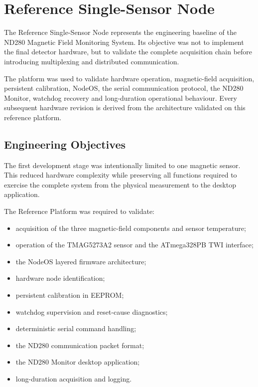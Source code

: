 \chapter{Reference Single-Sensor Node}
\label{chap:reference-node}

The Reference Single-Sensor Node represents the engineering baseline of the ND280 Magnetic Field Monitoring System. Its objective was not to implement the final detector hardware, but to validate the complete acquisition chain before introducing multiplexing and distributed communication.

The platform was used to validate hardware operation, magnetic-field acquisition, persistent calibration, NodeOS, the serial communication protocol, the ND280 Monitor, watchdog recovery and long-duration operational behaviour. Every subsequent hardware revision is derived from the architecture validated on this reference platform.

\section{Engineering Objectives}

The first development stage was intentionally limited to one magnetic sensor. This reduced hardware complexity while preserving all functions required to exercise the complete system from the physical measurement to the desktop application.

The Reference Platform was required to validate:
\begin{itemize}[leftmargin=*]
  \item acquisition of the three magnetic-field components and sensor temperature;
  \item operation of the TMAG5273A2 sensor and the ATmega328PB TWI interface;
  \item the NodeOS layered firmware architecture;
  \item hardware node identification;
  \item persistent calibration in EEPROM;
  \item watchdog supervision and reset-cause diagnostics;
  \item deterministic serial command handling;
  \item the ND280 communication packet format;
  \item the ND280 Monitor desktop application;
  \item long-duration acquisition and logging.
\end{itemize}

